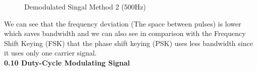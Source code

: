 \documentclass[12pt]{article}
\begin{document}
\begin{figure}[H]
    \centering
    \caption{Demodulated Singal Method 2 (500Hz)}
\end{figure}
We can see that the frequency deviation (The space between pulses) is lower which saves bandwidth and we can also see in comparison with the Frequency Shift Keying (FSK) that the phase shift keying (PSK) uses less bandwidth since it uses only one carrier signal. \\
\textbf{0.10 Duty-Cycle Modulating Signal}
\end{document}
